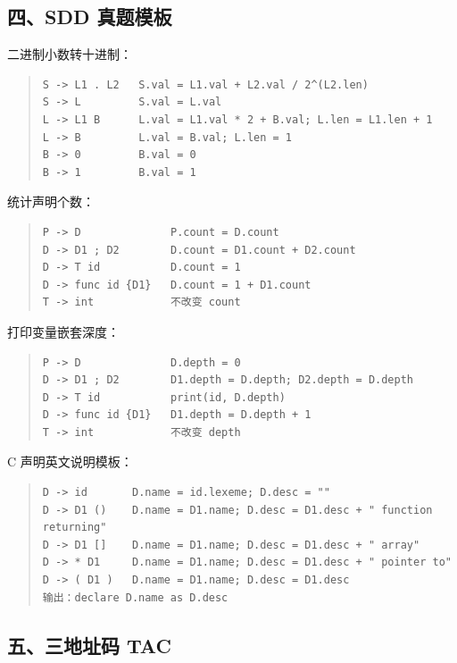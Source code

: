 \documentclass[UTF8,zihao=-4]{ctexart}
\begin{document}
\subsection{四、SDD 真题模板}


二进制小数转十进制：


\begin{quote}
\footnotesize
\begin{verbatim}
S -> L1 . L2   S.val = L1.val + L2.val / 2^(L2.len)
S -> L         S.val = L.val
L -> L1 B      L.val = L1.val * 2 + B.val; L.len = L1.len + 1
L -> B         L.val = B.val; L.len = 1
B -> 0         B.val = 0
B -> 1         B.val = 1
\end{verbatim}
\end{quote}


统计声明个数：


\begin{quote}
\footnotesize
\begin{verbatim}
P -> D              P.count = D.count
D -> D1 ; D2        D.count = D1.count + D2.count
D -> T id           D.count = 1
D -> func id {D1}   D.count = 1 + D1.count
T -> int            不改变 count
\end{verbatim}
\end{quote}


打印变量嵌套深度：


\begin{quote}
\footnotesize
\begin{verbatim}
P -> D              D.depth = 0
D -> D1 ; D2        D1.depth = D.depth; D2.depth = D.depth
D -> T id           print(id, D.depth)
D -> func id {D1}   D1.depth = D.depth + 1
T -> int            不改变 depth
\end{verbatim}
\end{quote}


C 声明英文说明模板：


\begin{quote}
\footnotesize
\begin{verbatim}
D -> id       D.name = id.lexeme; D.desc = ""
D -> D1 ()    D.name = D1.name; D.desc = D1.desc + " function returning"
D -> D1 []    D.name = D1.name; D.desc = D1.desc + " array"
D -> * D1     D.name = D1.name; D.desc = D1.desc + " pointer to"
D -> ( D1 )   D.name = D1.name; D.desc = D1.desc
输出：declare D.name as D.desc
\end{verbatim}
\end{quote}


\subsection{五、三地址码 TAC}
\end{document}
